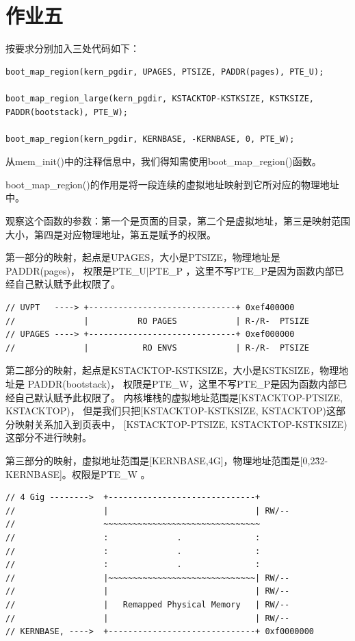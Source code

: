 \documentclass[12pt,a4paper,UTF8]{article}
\begin{document}
\section{作业五}

    按要求分别加入三处代码如下：
    \begin{lstlisting}[style=CPP]
boot_map_region(kern_pgdir, UPAGES, PTSIZE, PADDR(pages), PTE_U);

boot_map_region_large(kern_pgdir, KSTACKTOP-KSTKSIZE, KSTKSIZE, PADDR(bootstack), PTE_W);

boot_map_region(kern_pgdir, KERNBASE, -KERNBASE, 0, PTE_W);
    \end{lstlisting}

    从mem\_init()中的注释信息中，我们得知需使用boot\_map\_region()函数。

    boot\_map\_region()的作用是将一段连续的虚拟地址映射到它所对应的物理地址中。
    
    观察这个函数的参数：第一个是页面的目录，第二个是虚拟地址，第三是映射范围大小，第四是对应物理地址，第五是赋予的权限。

    第一部分的映射，起点是UPAGES，大小是PTSIZE，物理地址是PADDR(pages)，
    权限是PTE\_U$|$PTE\_P ，这里不写PTE\_P是因为函数内部已经自己默认赋予此权限了。

    \begin{lstlisting}[style=CPP]
// UVPT   ----> +------------------------------+ 0xef400000
//              |          RO PAGES            | R-/R-  PTSIZE
// UPAGES ----> +------------------------------+ 0xef000000
//              |           RO ENVS            | R-/R-  PTSIZE
    \end{lstlisting}

    第二部分的映射，起点是KSTACKTOP-KSTKSIZE，大小是KSTKSIZE，物理地址是 PADDR(bootstack)，
    权限是PTE\_W，这里不写PTE\_P是因为函数内部已经自己默认赋予此权限了。
    内核堆栈的虚拟地址范围是[KSTACKTOP-PTSIZE, KSTACKTOP)，
    但是我们只把[KSTACKTOP-KSTKSIZE, KSTACKTOP)这部分映射关系加入到页表中，
    [KSTACKTOP-PTSIZE, KSTACKTOP-KSTKSIZE)这部分不进行映射。

    第三部分的映射，虚拟地址范围是[KERNBASE,4G]，物理地址范围是[0,2\^32-KERNBASE]。权限是PTE\_W 。 

    \begin{lstlisting}[style=CPP]
// 4 Gig -------->  +------------------------------+
//                  |                              | RW/--
//                  ~~~~~~~~~~~~~~~~~~~~~~~~~~~~~~~~
//                  :              .               :
//                  :              .               :
//                  :              .               :
//                  |~~~~~~~~~~~~~~~~~~~~~~~~~~~~~~| RW/--
//                  |                              | RW/--
//                  |   Remapped Physical Memory   | RW/--
//                  |                              | RW/--
// KERNBASE, ---->  +------------------------------+ 0xf0000000
    \end{lstlisting}
\end{document}
